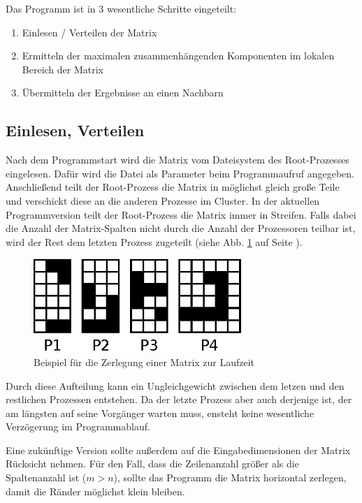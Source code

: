 Das Programm ist in 3 wesentliche Schritte eingeteilt:

\begin{enumerate}
	\item Einlesen / Verteilen der Matrix
	\item Ermitteln der maximalen zusammenhängenden Komponenten im lokalen Bereich der Matrix
	\item Übermitteln der Ergebnisse an einen Nachbarn
\end{enumerate}

\subsection{Einlesen, Verteilen}

Nach dem Programmstart wird die Matrix vom Dateisystem des Root-Prozesses eingelesen. Dafür wird die Datei als Parameter beim Programmaufruf angegeben. Anschließend teilt der Root-Prozess die Matrix in möglichst gleich große Teile und verschickt diese an die anderen Prozesse im Cluster. In der aktuellen Programmversion teilt der Root-Prozess die Matrix immer in Streifen. Falls dabei die Anzahl der Matrix-Spalten nicht durch die Anzahl der Prozessoren teilbar ist, wird der Rest dem letzten Prozess zugeteilt (siehe Abb. \ref{fig:matrix_zerteilung} auf Seite \pageref{fig:matrix_zerteilung}).

\begin{figure}[tbhp]
	\centering
	\includegraphics[width=0.7\textwidth]{images/matrix_split.eps}
	\caption{Beispiel für die Zerlegung einer Matrix zur Laufzeit}
	\label{fig:matrix_zerteilung}
\end{figure}

Durch diese Aufteilung kann ein Ungleichgewicht zwischen dem letzen und den restlichen Prozessen entstehen. Da der letzte Prozess aber auch derjenige ist, der am längsten auf seine Vorgänger warten muss, ensteht keine wesentliche Verzögerung im Programmablauf.

Eine zukünftige Version sollte außerdem auf die Eingabedimensionen der Matrix Rücksicht nehmen. Für den Fall, dass die Zeilenanzahl größer als die Spaltenanzahl ist ($m > n$), sollte das Programm die Matrix horizontal zerlegen, damit die Ränder möglichst klein bleiben.

